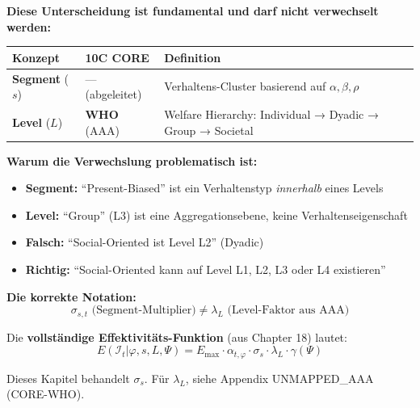 \begin{tcolorbox}[colback=red!5!white, colframe=red!75!black,
    title=\textbf{KRITISCHE KLARSTELLUNG: Segment $\neq$ Level (10C WHO)}]

\textbf{Diese Unterscheidung ist fundamental und darf nicht verwechselt werden:}

\begin{center}
\renewcommand{\arraystretch}{1.4}
\begin{tabular}{@{}lll@{}}
\toprule
\textbf{Konzept} & \textbf{10C CORE} & \textbf{Definition} \\
\midrule
\textbf{Segment} ($s$) & --- (abgeleitet) & Verhaltens-Cluster basierend auf $\alpha, \beta, \rho$ \\
\textbf{Level} ($L$) & \textbf{WHO} (AAA) & Welfare Hierarchy: Individual → Dyadic → Group → Societal \\
\bottomrule
\end{tabular}
\end{center}

\textbf{Warum die Verwechslung problematisch ist:}
\begin{itemize}[nosep]
\item \textbf{Segment:} ``Present-Biased'' ist ein Verhaltenstyp \textit{innerhalb} eines Levels
\item \textbf{Level:} ``Group'' (L3) ist eine Aggregationsebene, keine Verhaltenseigenschaft
\item \textbf{Falsch:} ``Social-Oriented ist Level L2'' (Dyadic)
\item \textbf{Richtig:} ``Social-Oriented kann auf Level L1, L2, L3 oder L4 existieren''
\end{itemize}

\textbf{Die korrekte Notation:}
\begin{equation}
\sigma_{s,t} \text{ (Segment-Multiplier)} \neq \lambda_{L} \text{ (Level-Faktor aus AAA)}
\end{equation}

Die \textbf{vollständige Effektivitäts-Funktion} (aus Chapter 18) lautet:
\begin{equation}
\boxed{E(\mathcal{I}_t | \varphi, s, L, \Psi) = E_{\max} \cdot \alpha_{t,\varphi} \cdot \sigma_s \cdot \lambda_L \cdot \gamma(\Psi)}
\end{equation}

Dieses Kapitel behandelt $\sigma_s$. Für $\lambda_L$, siehe Appendix UNMAPPED_AAA (CORE-WHO).
\end{tcolorbox}

